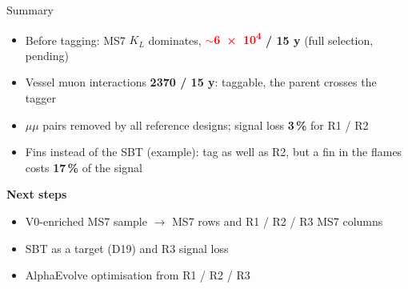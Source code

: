 \documentclass[aspectratio=149,11pt]{beamer}
\newcommand{\pend}[1]{\textcolor{red}{#1}}
\begin{document}
\begin{frame}{Summary}
  \begin{itemize}
    \item Before tagging: MS7 $K_L$ dominates, \textbf{\pend{$\sim$\num{6e4}} / 15 y} (full selection, pending)
    \item Vessel muon interactions \textbf{2370 / 15 y}: taggable, the parent crosses the tagger
    \item $\mu\mu$ pairs removed by all reference designs; signal loss \textbf{3\,\%} for R1 / R2
    \item Fins instead of the SBT (example): tag as well as R2, but a fin in the flames costs \textbf{17\,\%} of the signal
  \end{itemize}
  \vspace{0.3cm}
  \textbf{Next steps}
  \begin{itemize}
    \item V0-enriched MS7 sample $\to$ MS7 rows and R1 / R2 / R3 MS7 columns
    \item SBT as a target (D19) and R3 signal loss
    \item AlphaEvolve optimisation from R1 / R2 / R3
  \end{itemize}
\end{frame}
\end{document}
